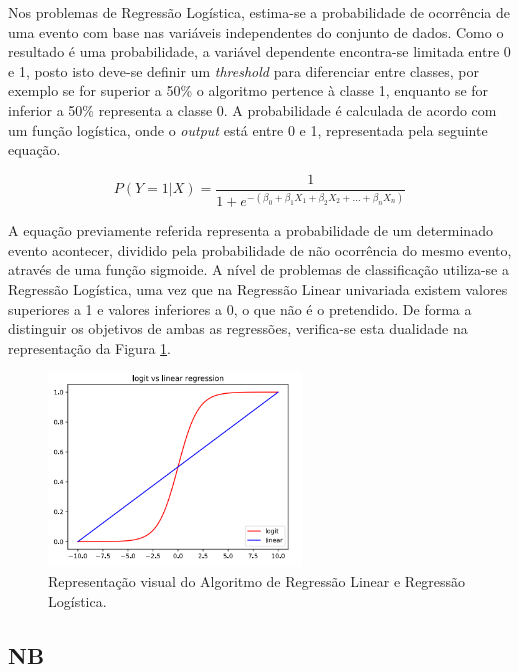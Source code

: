 \documentclass[12pt,a4paper,twoside]{report}
\begin{document}
{Nos problemas de Regressão Logística, estima-se a probabilidade de ocorrência de uma evento com base nas variáveis independentes do conjunto de dados. Como o resultado é uma probabilidade, a variável dependente encontra-se limitada entre 0 e 1, posto isto deve-se definir um \textit{threshold} para diferenciar entre classes, por exemplo se for superior a 50\% o algoritmo pertence à classe 1, enquanto se for inferior a 50\% representa a classe 0. A probabilidade é calculada de acordo com um função logística, onde o \textit{output} está entre 0 e 1, representada pela seguinte equação.


\begin{equation}
P(Y=1|X) = \frac{1}{1 + e^{-(\beta_0 + \beta_1X_1 + \beta_2X_2 + \ldots + \beta_nX_n)}}
\end{equation}

A equação previamente referida representa a probabilidade de um determinado evento acontecer, dividido pela probabilidade de não ocorrência do mesmo evento, através de uma função sigmoide. A nível de problemas de classificação utiliza-se a Regressão Logística, uma vez que na Regressão Linear univariada existem valores superiores a 1 e valores inferiores a 0, o que não é o pretendido. De forma a distinguir os objetivos de ambas as regressões, verifica-se esta dualidade na representação da Figura \ref{fig:linearvslogist}.

\begin{figure}[H]
    \centering
    \includegraphics[width=0.6\textwidth]{imagens/linearvslogistic.png}
    \caption{Representação visual do Algoritmo de Regressão Linear e Regressão Logística.}
    \label{fig:linearvslogist}
\end{figure}


\subsection{\gls{NB}}

}
\end{document}
